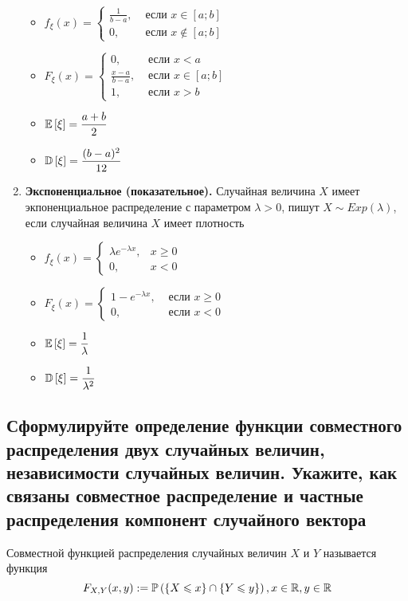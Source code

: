 \documentclass{article}
\begin{document}
\begin{enumerate}
    \begin{itemize}
        \item $f_{\xi}(x)=\begin{cases}
            \frac{1}{b-a},&\text{ если }x\in[a;b]\\
            0,&\text{ если }x\not\in[a;b]
        \end{cases}$
        \item $F_{\xi}(x)=\begin{cases}
            0,&\text{ если }x<a\\
            \frac{x-a}{b-a},&\text{ если }x\in[a;b]\\
            1,&\text{ если }x>b
        \end{cases}$
        \item $\mathbb{E}\left[\xi\right]=\displaystyle\frac{a+b}{2}$
        \item $\mathbb{D}\left[\xi\right]=\displaystyle\frac{(b-a)^2}{12}$
    \end{itemize}
    \item \textbf{Экспоненциальное (показательное).} Случайная величина $X$ имеет экпоненциальное распределение с параметром $\lambda>0$, пишут $X\sim Exp(\lambda)$, если случайная величина $X$ имеет плотность
    \begin{itemize}
        \item $f_{\xi}(x)=\begin{cases}
            \lambda e^{-\lambda x},&x\geqslant0\\
            0,&x<0
        \end{cases}$
        \item $F_{\xi}(x)=\begin{cases}
            1-e^{-\lambda x},&\text{ если }x\geqslant0\\
            0,&\text{ если }x<0
        \end{cases}$
        \item $\mathbb{E}\left[\xi\right]=\displaystyle\frac{1}{\lambda}$
        \item $\mathbb{D}\left[\xi\right]=\displaystyle\frac{1}{\lambda^2}$
    \end{itemize}
\end{enumerate}

\subsection{Сформулируйте определение функции совместного распределения двух случайных величин, независимости случайных величин. Укажите, как связаны совместное распределение и частные распределения компонент случайного вектора}
 Совместной функцией распределения случайных величин $X$ и $Y$ называется функция
\begin{equation*}
    F_{X,Y}(x,y):=\mathbb{P}\left(\{X\leqslant x\}\cap\{Y\leqslant y\}\right), x\in\mathbb{R},y\in\mathbb{R}
\end{equation*}
\end{document}
